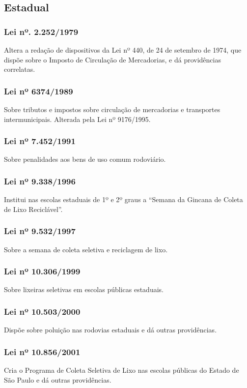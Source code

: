 \begin{subapend}
	\subsection{Estadual}
	\begin{subsubapend}
		\item \subsubsection{Lei nº. 2.252/1979}
		Altera a redação de dispositivos da Lei nº 440, de 24 de setembro de 1974, que dispõe sobre o Imposto de Circulação de Mercadorias, e dá providências correlatas.
		\subsubsection{Lei nº 6374/1989}
		Sobre tributos e impostos sobre circulação de mercadorias e transportes intermunicipais. Alterada pela Lei nº 9176/1995.
		\subsubsection{Lei nº 7.452/1991}
		Sobre penalidades aos bens de uso comum rodoviário.
		\subsubsection{Lei nº 9.338/1996}
		Institui nas escolas estaduais de 1º e 2º graus a “Semana da Gincana de Coleta de Lixo Reciclável”.
		\subsubsection{Lei nº 9.532/1997}
		Sobre a semana de coleta seletiva e reciclagem de lixo.
		\subsubsection{Lei nº 10.306/1999}
		Sobre lixeiras seletivas em escolas públicas estaduais.
		\subsubsection{Lei nº 10.503/2000}
		Dispõe sobre poluição nas rodovias estaduais e dá outras providências.
		\subsubsection{Lei nº 10.856/2001}
		Cria o Programa de Coleta Seletiva de Lixo nas escolas públicas do Estado de São Paulo e dá outras providências.

\end{subsubapend}
\end{subapend}
